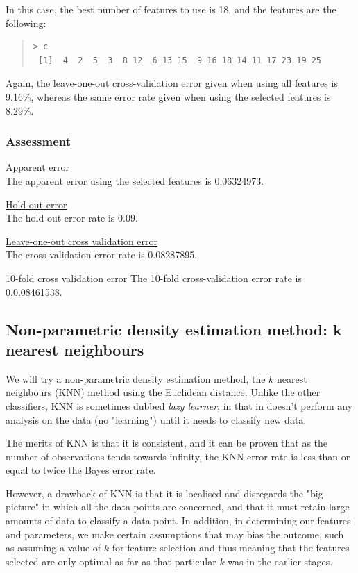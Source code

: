 \documentclass[11pt, a4paper]{article}
\begin{document}
In this case, the best number of features to use is 18, and the features are the following:

\begin{quote}
\begin{verbatim}
> c
 [1]  4  2  5  3  8 12  6 13 15  9 16 18 14 11 17 23 19 25
\end{verbatim}
\end{quote}

Again, the leave-one-out cross-validation error given when using all features is 9.16\%, whereas the same error rate given when using the selected features is 8.29\%.

\subsubsection{Assessment}

\underline{Apparent error}
\\
The apparent error using the selected features is 0.06324973.

\underline{Hold-out error}
\\
The hold-out error rate is 0.09.

\underline{Leave-one-out cross validation error}
\\
The cross-validation error rate is 0.08287895.

\underline{10-fold cross validation error}
The 10-fold cross-validation error rate is 0.0.08461538.


\subsection{Non-parametric density estimation method: k nearest neighbours}
We will try a non-parametric density estimation method, the $k$ nearest neighbours (KNN) method using the Euclidean distance. Unlike the other classifiers, KNN is sometimes dubbed \emph{lazy learner}, in that in doesn't perform any analysis on the data (no "learning") until it needs to classify new data.

The merits of KNN is that it is consistent, and it can be proven that as the number of observations tends towards infinity, the KNN error rate is less than or equal to twice the Bayes error rate.

However, a drawback of KNN is that it is localised and disregards the "big picture" in which all the data points are concerned, and that it must retain large amounts of data to classify a data point. In addition, in determining our features and parameters, we make certain assumptions that may bias the outcome, such as assuming a value of $k$ for feature selection and thus meaning that the features selected are only optimal as far as that particular $k$ was in the earlier stages. 
\end{document}

